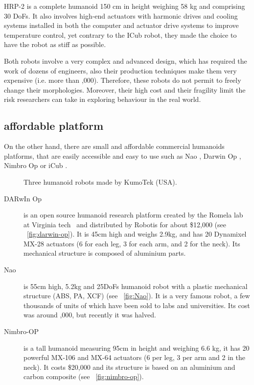 HRP-2 is a complete humanoid 150 cm in height weighing 58 kg and comprising 30 DoFs. It also involves high-end actuators with harmonic drives and cooling systems installed in both the computer and actuator drive systems to improve temperature control, yet contrary to the ICub robot, they made the choice to have the robot as stiff as possible.

Both robots involve a very complex and advanced design, which has required the work of dozens of engineers, also their production techniques make them very expensive (i.e. more than ,000). Therefore, these robots do not permit to freely change their morphologies. Moreover, their high cost and their fragility limit the risk researchers can take in exploring behaviour in the real world.



\subsection{affordable platform} %

On the other hand, there are small and affordable commercial humanoids platforms, that are easily accessible and easy to use such as Nao \cite{gouaillier2008nao}, Darwin Op \cite{ha2011development}, Nimbro Op \cite{schwarznimbro} or iCub \cite{metta2008icub}.

\begin{figure}[tb]
\centering
    \hfil
    \hfil
    \caption{Three humanoid robots made by KumoTek (USA).}
    \label{fig:kumotek_robots}
\end{figure}


\begin{description}
    \item[DARwIn Op] is an open source humanoid research platform created by the Romela lab at Virginia tech~\parencite{ha2011development} and distributed by Robotis for about \$12,000 (see \figurename~\ref{fig:darwin-op}). It is 45cm high and weighs 2.9kg, and has 20 Dynamixel MX-28 actuators (6 for each leg, 3 for each arm, and 2 for the neck). Its mechanical structure is composed of aluminium parts.
    \item[Nao] is 55cm high, 5.2kg and 25DoFs humanoid robot with a plastic mechanical structure (ABS, PA, XCF) (see \figurename~\ref{fig:Nao}). It is a very famous robot, a few thousands of units of which have been sold to labs and universities. Its cost was around ,000, but recently it was halved.
    \item[Nimbro-OP] is a tall humanoid measuring 95cm in height and weighing 6.6 kg, it has 20 powerful MX-106 and MX-64 actuators (6 per leg, 3 per arm and 2 in the neck). It costs \$20,000 and its structure is based on an aluminium and carbon composite (see \figurename~\ref{fig:nimbro-op}).
\end{description}

